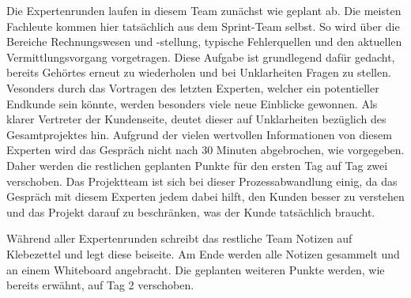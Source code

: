 Die Expertenrunden laufen in diesem Team zunächst wie geplant ab. Die meisten Fachleute kommen hier tatsächlich aus dem Sprint-Team selbst. So wird über die Bereiche Rechnungswesen und -stellung, typische Fehlerquellen und den aktuellen Vermittlungsvorgang vorgetragen. Diese Aufgabe ist grundlegend dafür gedacht, bereits Gehörtes erneut zu wiederholen und bei Unklarheiten Fragen zu stellen. Vesonders durch das Vortragen des letzten Experten, welcher ein potentieller Endkunde sein könnte, werden besonders viele neue Einblicke gewonnen. Als klarer Vertreter der Kundenseite, deutet dieser auf Unklarheiten bezüglich des Gesamtprojektes hin. Aufgrund der vielen wertvollen Informationen von diesem Experten wird das Gespräch nicht nach 30 Minuten abgebrochen, wie vorgegeben. Daher werden die restlichen geplanten Punkte für den ersten Tag auf Tag zwei verschoben. Das Projektteam ist sich bei dieser Prozessabwandlung einig, da das Gespräch mit diesem Experten jedem dabei hilft, den Kunden besser zu verstehen und das Projekt darauf zu beschränken, was der Kunde tatsächlich braucht.

Während aller Expertenrunden schreibt das restliche Team Notizen auf Klebezettel und legt diese beiseite. Am Ende werden alle Notizen gesammelt und an einem Whiteboard angebracht. Die geplanten weiteren Punkte werden, wie bereits erwähnt, auf Tag 2 verschoben.
%
%
%
%
%
%

